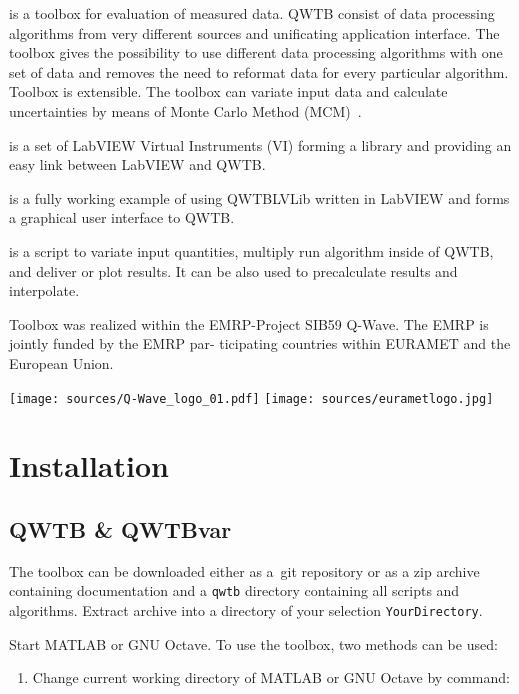 \documentclass[12pt,a4paper,oneside]{report} %
\def\matlab{{\sc MATLAB}\xspace}
\def\octave{{\sc GNU Octave}\xspace}
\def\labview{{\sc LabVIEW}\xspace}
\begin{document}
\bigskip
{} is a toolbox for evaluation of measured data. QWTB consist of data
processing algorithms from very different sources and unificating application interface. The toolbox
gives the possibility to use different data processing algorithms with one set of data and removes
the need to reformat data for every particular algorithm. Toolbox is extensible. The toolbox
can variate input data and calculate uncertainties by means of Monte Carlo Method
(MCM)~\cite{JCGM2008}.

\bigskip
{} is a set of \labview Virtual Instruments (VI) forming a library and
providing an easy link between \labview and QWTB.

\bigskip
{} is a fully working example of using
QWTBLVLib written in \labview and forms a graphical user interface to QWTB.

\bigskip
{} is a script to variate input quantities, multiply run algorithm inside
of QWTB, and deliver or plot results. It can be also used to precalculate results and interpolate.

\bigskip
\noindent Toolbox was realized within the EMRP-Project SIB59 Q-Wave. The EMRP is jointly funded by the EMRP
par- ticipating countries within EURAMET and the European Union.

\vfill
\texttt{[image: sources/Q-Wave\_logo\_01.pdf]}
\hfill
\texttt{[image: sources/eurametlogo.jpg]}


\chapter{Installation} %
\section{QWTB \& QWTBvar} %
The toolbox can be downloaded either as a~{\sc git} repository or as a zip archive containing
documentation and a {\tt qwtb} directory containing all scripts and algorithms. Extract
archive into a directory of your selection {\tt YourDirectory}.

Start \matlab or \octave. To use the toolbox, two methods can be used:
\begin{enumerate}
        \item Change current working directory of \matlab or \octave by command:
\end{enumerate}
\end{document}
